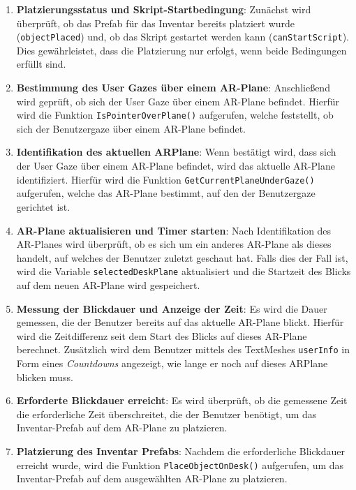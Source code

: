 \begin{enumerate}
    \item \textbf{Platzierungsstatus und Skript-Startbedingung}: Zunächst wird überprüft, ob das Prefab für das Inventar
    bereits platziert wurde (\texttt{objectPlaced}) und, ob das Skript gestartet werden kann (\texttt{canStartScript}).
    Dies gewährleistet, dass die Platzierung nur erfolgt, wenn beide Bedingungen erfüllt sind.

    \item \textbf{Bestimmung des User Gazes über einem AR-Plane}: Anschließend wird geprüft, ob sich der User Gaze über
    einem AR-Plane befindet. Hierfür wird die Funktion \texttt{IsPointerOverPlane()} aufgerufen, welche feststellt, ob
    sich der Benutzergaze über einem AR-Plane befindet.

    \item \textbf{Identifikation des aktuellen ARPlane}: Wenn bestätigt wird, dass sich der User Gaze über einem AR-Plane
    befindet, wird das aktuelle AR-Plane identifiziert. Hierfür wird die Funktion \texttt{GetCurrentPlaneUnderGaze()}
    aufgerufen, welche das AR-Plane bestimmt, auf den der Benutzergaze gerichtet ist.

    \item \textbf{AR-Plane aktualisieren und Timer starten}: Nach Identifikation des AR-Planes wird überprüft, ob es sich
    um ein anderes AR-Plane als dieses handelt, auf welches der Benutzer zuletzt geschaut hat. Falls dies der Fall ist,
    wird die Variable \texttt{selectedDeskPlane} aktualisiert und die Startzeit des Blicks auf dem neuen AR-Plane wird gespeichert.

    \item \textbf{Messung der Blickdauer und Anzeige der Zeit}: Es wird die Dauer gemessen, die der Benutzer bereits auf
    das aktuelle AR-Plane blickt. Hierfür wird die Zeitdifferenz seit dem Start des Blicks auf dieses AR-Plane berechnet.
    Zusätzlich wird dem Benutzer mittels des TextMeshes \texttt{userInfo} in Form eines \textit{Countdowns} angezeigt,
    wie lange er noch auf dieses ARPlane blicken muss.

    \item \textbf{Erforderte Blickdauer erreicht}: Es wird überprüft, ob die gemessene Zeit die erforderliche Zeit überschreitet,
    die der Benutzer benötigt, um das Inventar-Prefab auf dem AR-Plane zu platzieren.

    \item \textbf{Platzierung des Inventar Prefabs}: Nachdem die erforderliche Blickdauer erreicht wurde, wird die Funktion
    \texttt{PlaceObjectOnDesk()} aufgerufen, um das Inventar-Prefab auf dem ausgewählten AR-Plane zu platzieren.


\end{enumerate}
